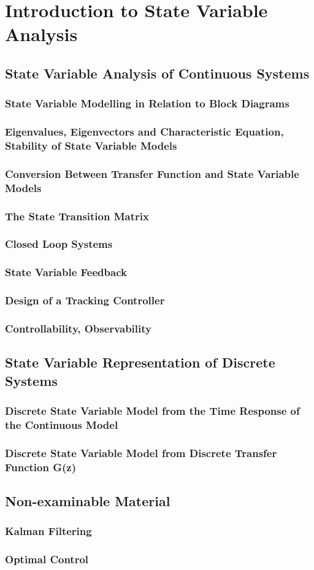 \chapter{Introduction to State Variable Analysis}

\section{State Variable Analysis of Continuous Systems}
\subsection{State Variable Modelling in Relation to Block Diagrams}
\subsection{Eigenvalues, Eigenvectors and Characteristic Equation, Stability of State Variable Models}
\subsection{Conversion Between Transfer Function and State Variable Models}
\subsection{The State Transition Matrix}
\subsection{Closed Loop Systems}
\subsection{State Variable Feedback}
\subsection{Design of a Tracking Controller}
\subsection{Controllability, Observability}

\section{State Variable Representation of Discrete Systems}
\subsection{Discrete State Variable Model from the Time Response of the Continuous Model}
\subsection{Discrete State Variable Model from Discrete Transfer Function G(z)}

\section{Non-examinable Material}
\subsection{Kalman Filtering}
\subsection{Optimal Control}